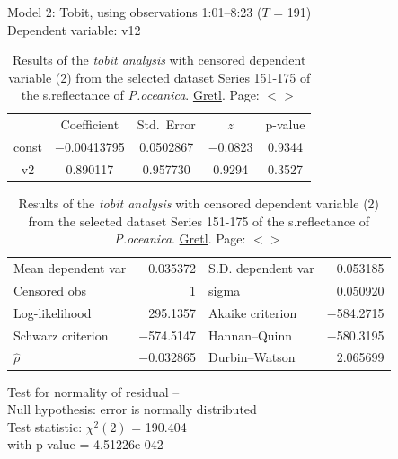 \documentclass[11pt]{article}
\begin{document}
\begin{appendices}
\begin{table}[H]
	\begin{center}
		\caption{Results of the \textit{tobit analysis} with censored dependent variable (2) from the selected dataset Series 151-175 of the s.reflectance of \textit{P.oceanica}. \href{http://gretl.sourceforge.net/}{Gretl}.  Page: $<$\pageref{page-41}$>$}
			Model 2: Tobit, using observations 1:01--8:23 ($T$ = 191)\\
			Dependent variable: v12\\
		\vspace{1em}
	\begin{tabular}{|c c c c c|}
		  &  {Coefficient} &    {Std.\ Error} & {$z$} & {p-value} \\[1ex]
		const &   $-$0.00413795 &     0.0502867 &     $-$0.0823 &         0.9344 \\
		v2 &   0.890117 &     0.957730 &       0.9294 &         0.3527 \\
	\end{tabular}

	\vspace{1ex}
	\begin{tabular}{lrlr}
		Mean dependent var &  0.035372 & S.D. dependent var &  0.053185 \\
		Censored obs &         1 & sigma &  0.050920 \\
		Log-likelihood &  295.1357 & Akaike criterion & $-$584.2715 \\
		Schwarz criterion & $-$574.5147 & Hannan--Quinn & $-$580.3195 \\
		$\hat{\rho}$ & $-$0.032865 & Durbin--Watson &  2.065699 \\
	\end{tabular}

	\vspace{1em}
	\begin{raggedright}
		Test for normality of residual --\\
		\quad Null hypothesis: error is normally distributed\\
		\quad Test statistic: $\chi^2(2)$ = 190.404\\
		\quad with p-value = 4.51226e-042\\
	\vspace{1ex}
	\end{raggedright}
	\label{tab:25}
	\end{center}
\end{table}


\end{appendices}
\end{document}
